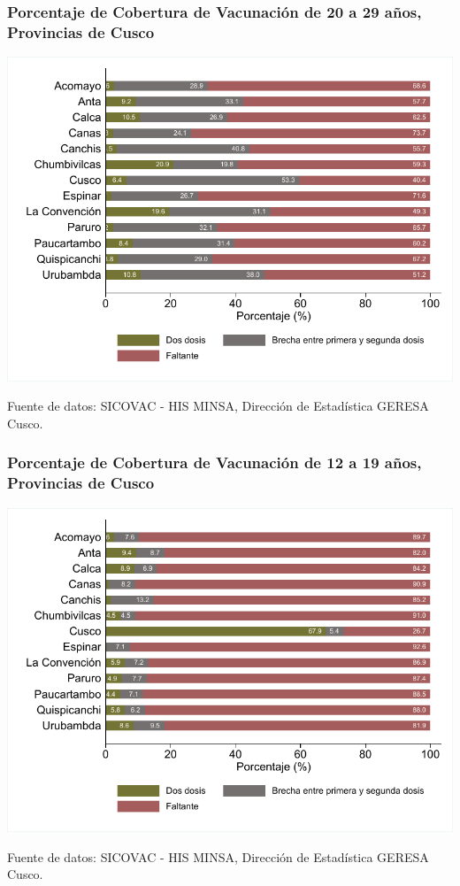 \documentclass[xcolor=table]{beamer}
\begin{document}
\begin{frame}[label=vacunas_20]
	\frametitle{Porcentaje de Cobertura de Vacunación de 20 a 29 años, Provincias de Cusco}
	\vspace{-.5cm}
	\begin{center}
		\includegraphics[width=0.8\linewidth, trim={.2cm .5cm .2cm .2cm},clip]{../figuras/vacunacion_provincial_edad_2.pdf}
	\end{center}
	{\tiny Fuente de datos: SICOVAC - HIS MINSA, Dirección de Estadística GERESA Cusco. \\}
\hyperlink{cobertura_vacuna_provincias}{}
\end{frame}

\begin{frame}[label=vacunas_10]
	\frametitle{Porcentaje de Cobertura de Vacunación de 12 a 19 años, Provincias de Cusco}
	\vspace{-.5cm}
	\begin{center}
		\includegraphics[width=0.8\linewidth, trim={.2cm .5cm .2cm .2cm},clip]{../figuras/vacunacion_provincial_edad_1.pdf}
	\end{center}
	{\tiny Fuente de datos: SICOVAC - HIS MINSA, Dirección de Estadística GERESA Cusco. \\}
\hyperlink{cobertura_vacuna_provincias}{}
\end{frame}
\end{document}
